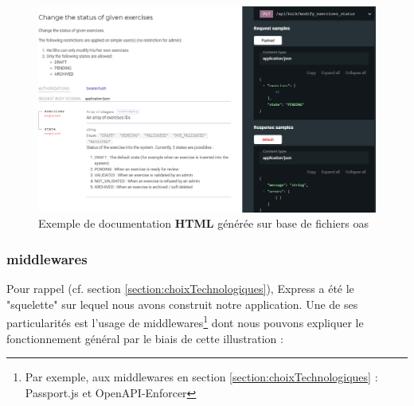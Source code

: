 \begin{figure}[H]
    \includegraphics[width=\textwidth,height=0.40\textheight,keepaspectratio]{images/serveur/doc_example.png}
    \centering
    \caption{Exemple de documentation \textbf{HTML} générée sur base de fichiers \Gls{oas}}
    \label{fig:exampleDoc}
\end{figure}

\pagebreak
\subsubsection{\Glspl{middleware}}

Pour rappel (cf. section \ref{section:choixTechnologiques}), Express a été le "squelette" sur lequel nous avons construit notre application.
Une de ses particularités est l'usage de \glspl{middleware}\footnote{
    Par exemple, aux \glspl{middleware} en section \ref{section:choixTechnologiques} : Passport.js et OpenAPI-Enforcer
} dont nous pouvons expliquer le fonctionnement général par le biais de cette illustration :

